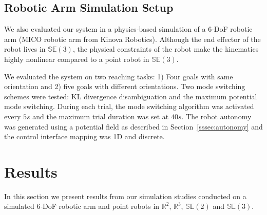 \documentclass[conference]{IEEEtran}
\begin{document}
\subsection{Robotic Arm	 Simulation Setup}
We also evaluated our system in a physics-based simulation of a 6-DoF robotic arm (MICO robotic arm from Kinova Robotics). Although the end effector of the robot lives in $\mathbb{SE}(3)$, the physical constraints of the robot make the kinematics highly nonlinear compared to a point robot in $\mathbb{SE}(3)$. 

We evaluated the system on two reaching tasks: 1) Four goals with same orientation and 2) five goals with different orientations. Two mode switching schemes were tested: KL divergence disambiguation and the maximum potential mode switching. During each trial, the mode switching algorithm was activated every $5s$ and the maximum trial duration was set at $40s$. The robot autonomy was generated using a potential field as described in Section~\ref{sssec:autonomy} and the control interface mapping was 1D and discrete.

\section{Results}\label{sec:results}

In this section we present results from our simulation studies conducted on a simulated 6-DoF robotic arm and point robots in $\mathbb{R}^2$, $\mathbb{R}^3$, $\mathbb{SE}(2)$ and $\mathbb{SE}(3)$. 
\end{document}
